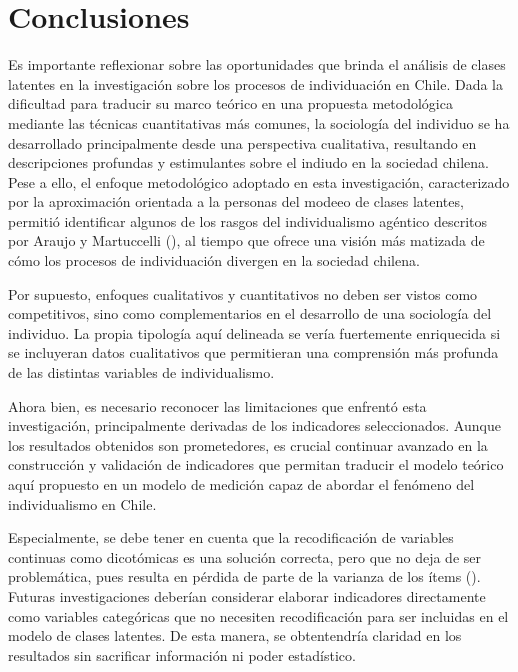 \documentclass[
  letterpaper,
  DIV=11,
  numbers=noendperiod]{scrartcl}
\begin{document}
\section{Conclusiones}\label{conclusiones}

Es importante reflexionar sobre las oportunidades que brinda el análisis
de clases latentes en la investigación sobre los procesos de
individuación en Chile. Dada la dificultad para traducir su marco
teórico en una propuesta metodológica mediante las técnicas
cuantitativas más comunes, la sociología del individuo se ha
desarrollado principalmente desde una perspectiva cualitativa,
resultando en descripciones profundas y estimulantes sobre el indiudo en
la sociedad chilena. Pese a ello, el enfoque metodológico adoptado en
esta investigación, caracterizado por la aproximación orientada a la
personas del modeeo de clases latentes, permitió identificar algunos de
los rasgos del individualismo agéntico descritos por Araujo y
Martuccelli (), al tiempo que ofrece una
visión más matizada de cómo los procesos de individuación divergen en la
sociedad chilena.

Por supuesto, enfoques cualitativos y cuantitativos no deben ser vistos
como competitivos, sino como complementarios en el desarrollo de una
sociología del individuo. La propia tipología aquí delineada se vería
fuertemente enriquecida si se incluyeran datos cualitativos que
permitieran una comprensión más profunda de las distintas variables de
individualismo.

Ahora bien, es necesario reconocer las limitaciones que enfrentó esta
investigación, principalmente derivadas de los indicadores
seleccionados. Aunque los resultados obtenidos son prometedores, es
crucial continuar avanzado en la construcción y validación de
indicadores que permitan traducir el modelo teórico aquí propuesto en un
modelo de medición capaz de abordar el fenómeno del individualismo en
Chile.

Especialmente, se debe tener en cuenta que la recodificación de
variables continuas como dicotómicas es una solución correcta, pero que
no deja de ser problemática, pues resulta en pérdida de parte de la
varianza de los ítems (). Futuras investigaciones deberían considerar elaborar indicadores
directamente como variables categóricas que no necesiten recodificación
para ser incluidas en el modelo de clases latentes. De esta manera, se
obtentendría claridad en los resultados sin sacrificar información ni
poder estadístico.
\end{document}
